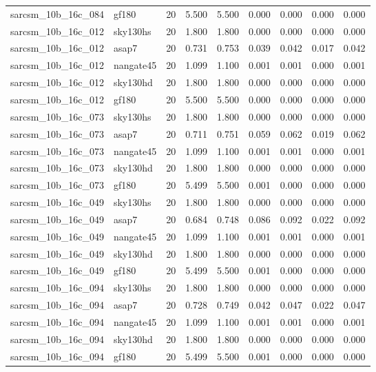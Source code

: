 \begin{tabular}{llrrrrrrr}
sarcsm\_10b\_16c\_084 & gf180 & 20 & 5.500 & 5.500 & 0.000 & 0.000 & 0.000 & 0.000 \\
sarcsm\_10b\_16c\_012 & sky130hs & 20 & 1.800 & 1.800 & 0.000 & 0.000 & 0.000 & 0.000 \\
sarcsm\_10b\_16c\_012 & asap7 & 20 & 0.731 & 0.753 & 0.039 & 0.042 & 0.017 & 0.042 \\
sarcsm\_10b\_16c\_012 & nangate45 & 20 & 1.099 & 1.100 & 0.001 & 0.001 & 0.000 & 0.001 \\
sarcsm\_10b\_16c\_012 & sky130hd & 20 & 1.800 & 1.800 & 0.000 & 0.000 & 0.000 & 0.000 \\
sarcsm\_10b\_16c\_012 & gf180 & 20 & 5.500 & 5.500 & 0.000 & 0.000 & 0.000 & 0.000 \\
sarcsm\_10b\_16c\_073 & sky130hs & 20 & 1.800 & 1.800 & 0.000 & 0.000 & 0.000 & 0.000 \\
sarcsm\_10b\_16c\_073 & asap7 & 20 & 0.711 & 0.751 & 0.059 & 0.062 & 0.019 & 0.062 \\
sarcsm\_10b\_16c\_073 & nangate45 & 20 & 1.099 & 1.100 & 0.001 & 0.001 & 0.000 & 0.001 \\
sarcsm\_10b\_16c\_073 & sky130hd & 20 & 1.800 & 1.800 & 0.000 & 0.000 & 0.000 & 0.000 \\
sarcsm\_10b\_16c\_073 & gf180 & 20 & 5.499 & 5.500 & 0.001 & 0.000 & 0.000 & 0.000 \\
sarcsm\_10b\_16c\_049 & sky130hs & 20 & 1.800 & 1.800 & 0.000 & 0.000 & 0.000 & 0.000 \\
sarcsm\_10b\_16c\_049 & asap7 & 20 & 0.684 & 0.748 & 0.086 & 0.092 & 0.022 & 0.092 \\
sarcsm\_10b\_16c\_049 & nangate45 & 20 & 1.099 & 1.100 & 0.001 & 0.001 & 0.000 & 0.001 \\
sarcsm\_10b\_16c\_049 & sky130hd & 20 & 1.800 & 1.800 & 0.000 & 0.000 & 0.000 & 0.000 \\
sarcsm\_10b\_16c\_049 & gf180 & 20 & 5.499 & 5.500 & 0.001 & 0.000 & 0.000 & 0.000 \\
sarcsm\_10b\_16c\_094 & sky130hs & 20 & 1.800 & 1.800 & 0.000 & 0.000 & 0.000 & 0.000 \\
sarcsm\_10b\_16c\_094 & asap7 & 20 & 0.728 & 0.749 & 0.042 & 0.047 & 0.022 & 0.047 \\
sarcsm\_10b\_16c\_094 & nangate45 & 20 & 1.099 & 1.100 & 0.001 & 0.001 & 0.000 & 0.001 \\
sarcsm\_10b\_16c\_094 & sky130hd & 20 & 1.800 & 1.800 & 0.000 & 0.000 & 0.000 & 0.000 \\
sarcsm\_10b\_16c\_094 & gf180 & 20 & 5.499 & 5.500 & 0.001 & 0.000 & 0.000 & 0.000 \\

\end{tabular}

